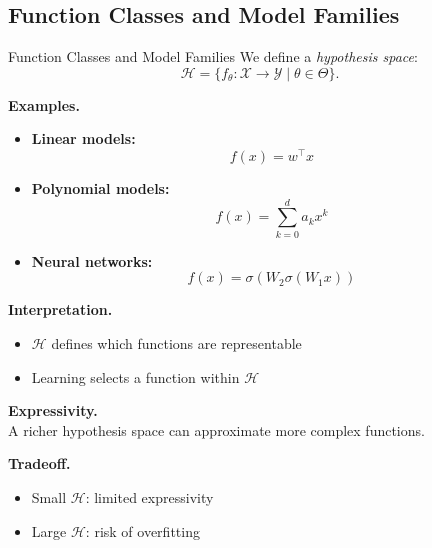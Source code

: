 \documentclass[aspectratio=169,11pt]{beamer}
\begin{document}
\subsection{Function Classes and Model Families}
\begin{frame}[t,allowframebreaks]{Function Classes and Model Families}
\small
We define a \emph{hypothesis space}:
\[
\mathcal{H} = \{ f_\theta : \mathcal{X} \to \mathcal{Y} \mid \theta \in \Theta \}.
\]

\textbf{Examples.}\\ \begin{itemize}
    \item \textbf{Linear models:}\\ \[
    f(x) = w^\top x
    \]

    \item \textbf{Polynomial models:}\\ \[
    f(x) = \sum_{k=0}^d a_k x^k
    \]

    \item \textbf{Neural networks:}\\ \[
    f(x) = \sigma(W_2 \sigma(W_1 x))
    \]
\end{itemize}

\textbf{Interpretation.}\\ \begin{itemize}
    \item $\mathcal{H}$ defines which functions are representable
    \item Learning selects a function within $\mathcal{H}$
\end{itemize}

\textbf{Expressivity.}\\ A richer hypothesis space can approximate more complex functions.

\textbf{Tradeoff.}\\ \begin{itemize}
    \item Small $\mathcal{H}$: limited expressivity
    \item Large $\mathcal{H}$: risk of overfitting
\end{itemize}
\end{frame}
\end{document}
